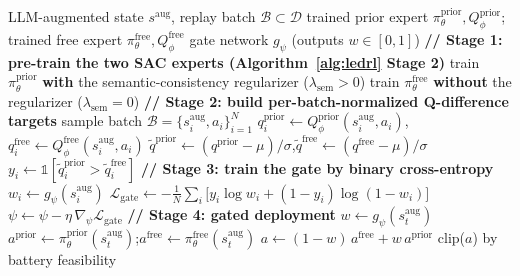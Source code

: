 \documentclass{ieeeaccess}
\begin{document}
\begin{algorithm}[t!]
\caption{Learned Event-Coverage Gate Training}
\label{alg:gate}
\begin{algorithmic}[1]
\Require LLM-augmented state $s^{\mathrm{aug}}$, replay batch $\mathcal{B} \subset \mathcal{D}$
\Require trained prior expert $\pi^{\mathrm{prior}}_\theta, Q^{\mathrm{prior}}_\phi$; trained free expert $\pi^{\mathrm{free}}_\theta, Q^{\mathrm{free}}_\phi$
\Require gate network $g_\psi$ (outputs $w \in [0,1]$)
\State \textbf{// Stage 1: pre-train the two SAC experts (Algorithm~\ref{alg:ledrl} Stage 2)}
\State train $\pi^{\mathrm{prior}}_\theta$ \textbf{with} the semantic-consistency regularizer ($\lambda_{\mathrm{sem}}>0$)
\State train $\pi^{\mathrm{free}}_\theta$ \textbf{without} the regularizer ($\lambda_{\mathrm{sem}}=0$)
\State \textbf{// Stage 2: build per-batch-normalized Q-difference targets}
\State sample batch $\mathcal{B} = \{s^{\mathrm{aug}}_i, a_i\}_{i=1}^{N}$
\State $q^{\mathrm{prior}}_i \gets Q^{\mathrm{prior}}_\phi(s^{\mathrm{aug}}_i, a_i)$,\quad $q^{\mathrm{free}}_i \gets Q^{\mathrm{free}}_\phi(s^{\mathrm{aug}}_i, a_i)$
\State $\tilde{q}^{\mathrm{prior}} \gets (q^{\mathrm{prior}} - \mu)/\sigma$,\quad $\tilde{q}^{\mathrm{free}} \gets (q^{\mathrm{free}} - \mu)/\sigma$ 
\State $y_i \gets \mathbb{1}[\tilde{q}^{\mathrm{prior}}_i > \tilde{q}^{\mathrm{free}}_i]$ 
\State \textbf{// Stage 3: train the gate by binary cross-entropy}
    \State $w_i \gets g_\psi(s^{\mathrm{aug}}_i)$
    \State $\mathcal{L}_{\mathrm{gate}} \gets -\frac{1}{N}\sum_i \big[ y_i \log w_i + (1-y_i)\log(1-w_i) \big]$
    \State $\psi \gets \psi - \eta\, \nabla_\psi \mathcal{L}_{\mathrm{gate}}$
\EndFor
\State \textbf{// Stage 4: gated deployment}
    \State $w \gets g_\psi(s^{\mathrm{aug}}_t)$
    \State $a^{\mathrm{prior}} \gets \pi^{\mathrm{prior}}_\theta(s^{\mathrm{aug}}_t)$;\quad $a^{\mathrm{free}} \gets \pi^{\mathrm{free}}_\theta(s^{\mathrm{aug}}_t)$
    \State $a \gets (1-w)\,a^{\mathrm{free}} + w\,a^{\mathrm{prior}}$
    \State \Return clip($a$) by battery feasibility
\EndFunction
\end{algorithmic}
\end{algorithm}
\end{document}
